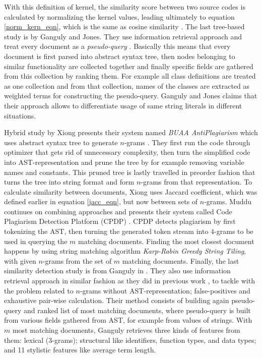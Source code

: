 \noindent
With this definition of kernel, the similarity score between two source codes is calculated by normalizing the kernel values, leading ultimately to equation \ref{norm_kern_eqn}, which is the same as cosine similarity \cite{Fu2017WASTKAW}. The last tree-based study is by Ganguly and Jones. They use information retrieval approach and treat every document as a \emph{pseudo-query} \cite{AIR2015}. Basically this means that every document is first parsed into abstract syntax tree, then nodes belonging to similar functionality are collected together and finally specific fields are gathered from this collection by ranking them. For example all class definitions are treated as one collection and from that collection, names of the classes are extracted as weighted terms for constructing the pseudo-query. Ganguly and Jones claims that their approach allows to differentiate usage of same string literals in different situations.

Hybrid study by Xiong \etal presents their system named \textit{BUAA AntiPlagiarism} which uses abstract syntax tree to generate $n$-grams \cite{BUAA2009}. They first run the code through optimizer that gets rid of unnecessary complexity, then turn the simplified code into AST-representation and prune the tree by for example removing variable names and constants. This pruned tree is lastly travelled in preorder fashion that turns the tree into string format and form $n$-grams from that representation. To calculate similarity between documents, Xiong \etal uses Jaccard coefficient, which was defined earlier in equation \ref{jacc_eqn}, but now between sets of $n$-grams. Muddu \etal continues on combining approaches and presents their system called Code Plagiarism Detection Platform (CPDP) \cite{CPDPPD2013}. CPDP detects plagiarism by first tokenizing the AST, then turning the generated token stream into $4$-grams to be used in querying the $m$ matching documents. Finding the most closest document happens by using string matching algorithm \emph{Karp-Rabin Greedy String Tiling}, with given $n$-grams from the set of $m$ matching documents. Finally, the last similarity detection study is from Ganguly \etal in \cite{RCISCP2017}. They also use information retrieval approach in similar fashion as they did in previous work \cite{AIR2015}, to tackle with the problem related to $n$-grams without AST-representation; false-positives and exhaustive pair-wise calculation. Their method consists of building again pseudo-query and ranked list of most matching documents, where pseudo-query is built from various fields gathered from AST, for example from values of strings. With $m$ most matching documents, Ganguly \etal retrieves three kinds of features from them: lexical (3-grams); structural like identifiers, function types, and data types; and 11 stylistic features like average term length.   

